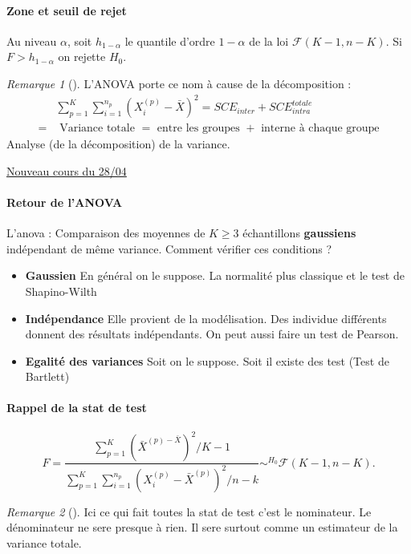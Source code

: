 \documentclass{article}
\theoremstyle{plain}%
\theoremstyle{definition}
\theoremstyle{remark}
\newtheorem*{rem}{Remarque}
\begin{document}
\paragraph*{Zone et seuil de rejet}
Au niveau $ \alpha  $, soit $ h_{1 - \alpha } $ le quantile d'ordre $ 1 - \alpha  $ de la loi $ \mathcal{F}(K-1, n-K) $. Si $ F > h_{1 - \alpha } $ on rejette $ H_0 $. 

\begin{rem}[]
    L'ANOVA porte ce nom à cause de la décomposition : 
    \begin{align*}
        & \sum_{p=1}^{K}\sum_{i=1}^{n_p}(X_i^{(p)} - \bar{X})^2 = SCE_{inter} + SCE^{totale}_{intra} \\
        = & \text{ Variance totale } = \text{ entre les groupes } + \text{ interne à chaque groupe}
    \end{align*}
    Analyse (de la décomposition) de la variance.
\end{rem}

\underline{Nouveau cours du 28/04} \\
\paragraph{Retour de l'ANOVA}
L'anova : Comparaison des moyennes de $ K \geq 3 $ échantillons \textbf{gaussiens} indépendant de même variance. Comment vérifier ces conditions ? 
\begin{itemize}
    \item \textbf{Gaussien} En général on le suppose. La normalité plus classique et le test de Shapino-Wilth
    \item \textbf{Indépendance} Elle provient de la modélisation. Des individue différents donnent des résultats indépendants. On peut aussi faire un test de Pearson.
    \item \textbf{Egalité des variances} Soit on le suppose. Soit il existe des test (Test de Bartlett)
\end{itemize}

\paragraph*{Rappel de la stat de test} 
\[
    F = \frac{\sum_{p=1}^{K}(\bar{X}^{(p) - \bar{X} })^2 / K-1 }{ \sum_{p=1}^{K}\sum_{i=1}^{n_p} (X_i^{(p)} - \bar{X}^{(p)})^2 / n-k} \sim ^{H_0} \mathcal{F}(K-1, n-K)
.\]
\begin{rem}[]
    Ici ce qui fait toutes la stat de test c'est le nominateur. Le dénominateur ne sere presque à rien. Il sere surtout comme un estimateur de la variance totale.
\end{rem}
\end{document}
